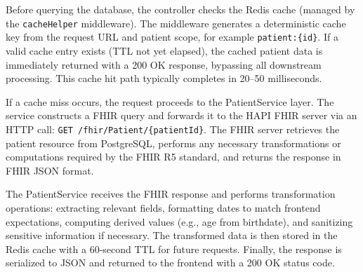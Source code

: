 Before querying the database, the controller checks the Redis cache (managed by
the \texttt{cacheHelper} middleware). The middleware generates a deterministic
cache key from the request URL and patient scope, for example
\texttt{patient:\{id\}}. If a valid cache entry exists (TTL not yet elapsed),
the cached patient data is immediately returned with a 200 OK response,
bypassing all downstream processing. This cache hit path typically completes in
20--50 milliseconds.

If a cache miss occurs, the request proceeds to the PatientService layer. The
service constructs a FHIR query and forwards it to the HAPI FHIR server via an
HTTP call: \texttt{GET /fhir/Patient/\{patientId\}}. The FHIR server retrieves
the patient resource from PostgreSQL, performs any necessary transformations or
computations required by the FHIR R5 standard, and returns the response in FHIR
JSON format.

The PatientService receives the FHIR response and performs transformation
operations: extracting relevant fields, formatting dates to match frontend
expectations, computing derived values (e.g., age from birthdate), and
sanitizing sensitive information if necessary. The transformed data is then
stored in the Redis cache with a 60-second TTL for future requests. Finally,
the response is serialized to JSON and returned to the frontend with a 200 OK
status code.

